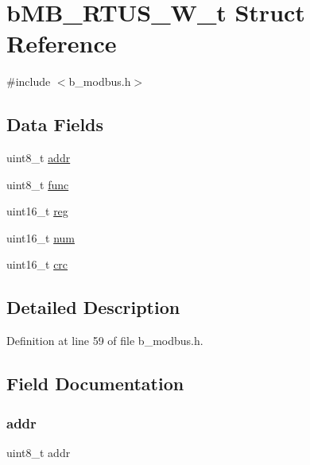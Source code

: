 \hypertarget{structb_m_b___r_t_u_s___w__t}{}\section{b\+M\+B\+\_\+\+R\+T\+U\+S\+\_\+\+W\+\_\+t Struct Reference}
\label{structb_m_b___r_t_u_s___w__t}


{\ttfamily \#include $<$b\+\_\+modbus.\+h$>$}

\subsection*{Data Fields}
\begin{DoxyCompactItemize}
\item 
uint8\+\_\+t \mbox{\hyperlink{structb_m_b___r_t_u_s___w__t_af5105c72a61e60d3b44670de20e0c3fb}{addr}}
\item 
uint8\+\_\+t \mbox{\hyperlink{structb_m_b___r_t_u_s___w__t_ac6b64f60b8100dc86a10a524158c21ce}{func}}
\item 
uint16\+\_\+t \mbox{\hyperlink{structb_m_b___r_t_u_s___w__t_a11760f5020019f4aa8cb02e694f7cc44}{reg}}
\item 
uint16\+\_\+t \mbox{\hyperlink{structb_m_b___r_t_u_s___w__t_a8bf0d44a6ead3e7cc2898ba02498749e}{num}}
\item 
uint16\+\_\+t \mbox{\hyperlink{structb_m_b___r_t_u_s___w__t_aa60093a9a5d5d17864cfda66c47733e3}{crc}}
\end{DoxyCompactItemize}


\subsection{Detailed Description}


Definition at line 59 of file b\+\_\+modbus.\+h.



\subsection{Field Documentation}
\mbox{\label{structb_m_b___r_t_u_s___w__t_af5105c72a61e60d3b44670de20e0c3fb}} 
\subsubsection{\texorpdfstring{addr}{addr}}
{\footnotesize\ttfamily uint8\+\_\+t addr}



